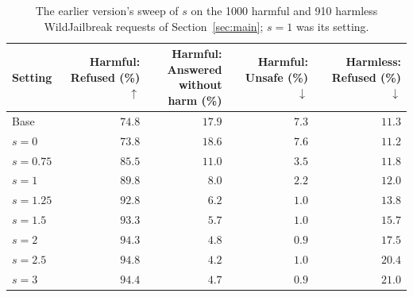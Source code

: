 \documentclass[10pt,a4paper]{article}
\renewcommand{\arraystretch}{1.12}
\begin{document}
\begin{table}[H]\centering\small\renewcommand{\arraystretch}{1.25}\begin{tabular}{|l|r|r|r|r|}\hline
Setting & \makecell[r]{Harmful:\\Refused (\%) $\uparrow$} & \makecell[r]{Harmful: Answered\\without harm (\%)} & \makecell[r]{Harmful:\\Unsafe (\%) $\downarrow$} & \makecell[r]{Harmless:\\Refused (\%) $\downarrow$}\\\hline
Base & $74.8$ & $17.9$ & $7.3$ & $11.3$\\\hline
$s = 0$ & $73.8$ & $18.6$ & $7.6$ & $11.2$\\\hline
$s = 0.75$ & $85.5$ & $11.0$ & $3.5$ & $11.8$\\\hline
$s = 1$ & $89.8$ & $8.0$ & $2.2$ & $12.0$\\\hline
$s = 1.25$ & $92.8$ & $6.2$ & $1.0$ & $13.8$\\\hline
$s = 1.5$ & $93.3$ & $5.7$ & $1.0$ & $15.7$\\\hline
$s = 2$ & $94.3$ & $4.8$ & $0.9$ & $17.5$\\\hline
$s = 2.5$ & $94.8$ & $4.2$ & $1.0$ & $20.4$\\\hline
$s = 3$ & $94.4$ & $4.7$ & $0.9$ & $21.0$\\\hline
\end{tabular}
\caption{The earlier version's sweep of $s$ on the 1000 harmful and 910 harmless WildJailbreak requests of Section~\ref{sec:main}; $s = 1$ was its setting.}\label{tab:app1}\end{table}
\end{document}
